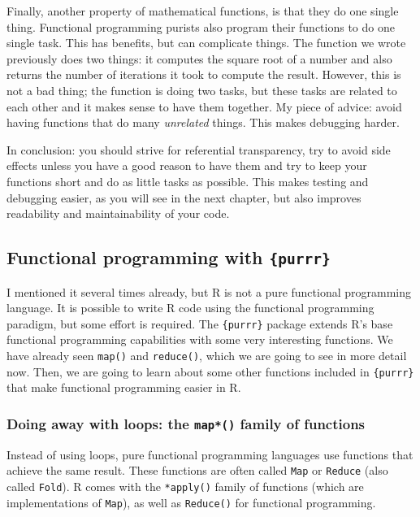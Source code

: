 \documentclass[
]{article}
\begin{document}
Finally, another property of mathematical functions, is that they do one single thing. Functional
programming purists also program their functions to do one single task. This has benefits, but
can complicate things. The function we wrote previously does two things: it computes the square
root of a number and also returns the number of iterations it took to compute the result. However,
this is not a bad thing; the function is doing two tasks, but these tasks are related to each other
and it makes sense to have them together. My piece of advice: avoid having functions that do
many \emph{unrelated} things. This makes debugging harder.

In conclusion: you should strive for referential transparency, try to avoid side effects unless you
have a good reason to have them and try to keep your functions short and do as little tasks as
possible. This makes testing and debugging easier, as you will see in the next chapter, but also
improves readability and maintainability of your code.

\hypertarget{functional-programming-with-purrr}{%
\subsection{\texorpdfstring{Functional programming with \texttt{\{purrr\}}}{Functional programming with \{purrr\}}}\label{functional-programming-with-purrr}}

I mentioned it several times already, but R is not a pure functional programming language. It is
possible to write R code using the functional programming paradigm, but some effort is required.
The \texttt{\{purrr\}} package extends R's base functional programming capabilities with some very interesting
functions. We have already seen \texttt{map()} and \texttt{reduce()}, which we are going to see in more detail now.
Then, we are going to learn about some other functions included in \texttt{\{purrr\}} that make functional
programming easier in R.

\hypertarget{doing-away-with-loops-the-map-family-of-functions}{%
\subsubsection{\texorpdfstring{Doing away with loops: the \texttt{map*()} family of functions}{Doing away with loops: the map*() family of functions}}\label{doing-away-with-loops-the-map-family-of-functions}}

Instead of using loops, pure functional programming languages use functions that achieve
the same result. These functions are often called \texttt{Map} or \texttt{Reduce} (also called \texttt{Fold}). R comes
with the \texttt{*apply()} family of functions (which are implementations of \texttt{Map}),
as well as \texttt{Reduce()} for functional programming.
\end{document}
